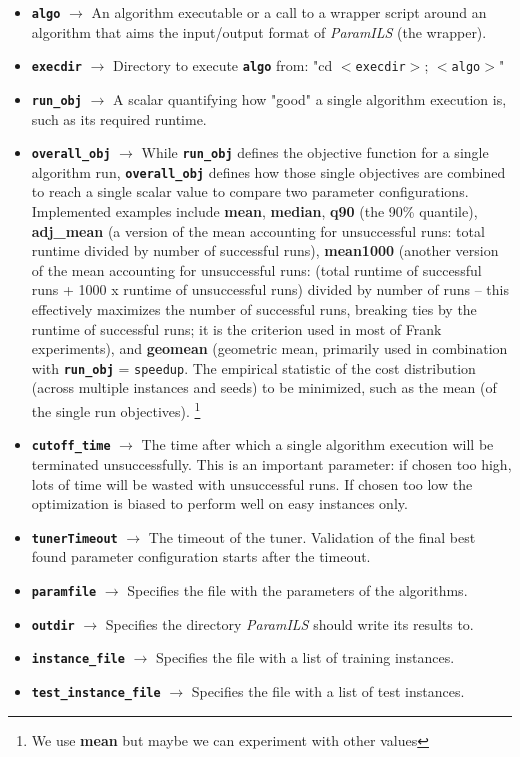 \begin{itemize}
	\item \textbf{\texttt{algo}} $\rightarrow$ An algorithm executable or a call to a wrapper script around an algorithm that aims the input/output format of \textit{ParamILS} (the wrapper).
	\item \textbf{\texttt{execdir}} $\rightarrow$ Directory to execute \textbf{\texttt{algo}} from: "cd $<$\texttt{execdir}$>$; $<$\texttt{algo}$>$" 
	\item \textbf{\texttt{run\_obj}} $\rightarrow$ A scalar quantifying how "good" a single algorithm execution is, such as its required runtime.
	\item \textbf{\texttt{overall\_obj}} $\rightarrow$ While \textbf{\texttt{run\_obj}} defines the objective function for a single algorithm run, \textbf{\texttt{overall\_obj}} defines how those single objectives are combined to reach a single scalar value to compare two parameter configurations. Implemented examples include {\bf mean}, {\bf median}, {\bf q90} (the 90\% quantile), {\bf adj\_mean} (a version of the mean accounting for unsuccessful runs: total runtime divided by number of successful runs), {\bf mean1000} (another version of the mean accounting for unsuccessful runs: (total runtime of successful runs + 1000 x runtime of unsuccessful runs) divided by number of runs -- this effectively maximizes the number of successful runs, breaking ties by the runtime of successful runs; it is the criterion used in most of Frank experiments), and {\bf geomean} (geometric mean, primarily used in combination with \textbf{\texttt{run\_obj}} = \texttt{speedup}. The empirical statistic of the cost distribution (across multiple instances and seeds) to be minimized, such as the mean (of the single run objectives). \footnote{We use {\bf mean} but maybe we can experiment with other values}
	\item \textbf{\texttt{cutoff\_time}} $\rightarrow$ The time after which a single algorithm execution will be terminated unsuccessfully. This is an important parameter: if chosen too high, lots of time will be wasted with unsuccessful runs. If chosen too low the optimization is biased to perform well on easy instances only.
	\item \textbf{\texttt{tunerTimeout}} $\rightarrow$ The timeout of the tuner. Validation of the final best found parameter configuration starts after the timeout.
	\item \textbf{\texttt{paramfile}} $\rightarrow$ Specifies the file with the parameters of the algorithms. 
	\item \textbf{\texttt{outdir}} $\rightarrow$ Specifies the directory \textit{ParamILS} should write its results to.
	\item \textbf{\texttt{instance\_file}} $\rightarrow$ Specifies the file with a list of training instances. 
	\item \textbf{\texttt{test\_instance\_file}} $\rightarrow$ Specifies the file with a list of test instances.
\end{itemize}

